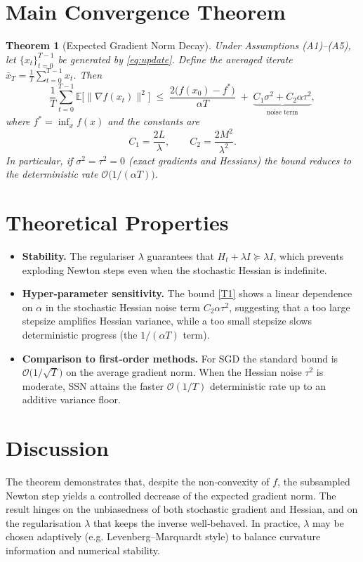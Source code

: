 \documentclass{article}
\newtheorem{theorem}{Theorem}
\newcommand{\EE}{\mathbb{E}}
\begin{document}
\section*{Main Convergence Theorem}
\begin{theorem}[Expected Gradient Norm Decay]
\label{thm:main}
Under Assumptions (A1)–(A5), let $\{x_t\}_{t=0}^{T-1}$ be generated by
\eqref{eq:update}.  Define the averaged iterate
$\bar x_T=\frac1T\sum_{t=0}^{T-1}x_t$.  Then
\[
\frac{1}{T}\sum_{t=0}^{T-1}\EE\bigl[\|\nabla f(x_t)\|^{2}\bigr]
\;\le\;
\frac{2\bigl(f(x_0)-f^{*}\bigr)}{\alpha T}
\;+\;
\underbrace{C_{1}\sigma^{2}+C_{2}\alpha\tau^{2}}_{\displaystyle\text{noise term}},
\tag{T1}
\]
where $f^{*}=\inf_{x}f(x)$ and the constants are
\[
C_{1}= \frac{2L}{\lambda},\qquad 
C_{2}= \frac{2M^{2}}{\lambda^{2}}.
\]
In particular, if $\sigma^{2}=\tau^{2}=0$ (exact gradients and
Hessians) the bound reduces to the deterministic rate
$\mathcal{O}\!\bigl(1/(\alpha T)\bigr)$.
\end{theorem}

\section*{Theoretical Properties}
\begin{itemize}
\item \textbf{Stability.}  The regulariser $\lambda$ guarantees that
  $H_t+\lambda I\succeq\lambda I$, which prevents exploding
  Newton steps even when the stochastic Hessian is indefinite.
\item \textbf{Hyper‑parameter sensitivity.}
  The bound \eqref{T1} shows a linear dependence on $\alpha$ in the
  stochastic Hessian noise term $C_{2}\alpha\tau^{2}$, suggesting that
  a too large stepsize amplifies Hessian variance, while a too small
  stepsize slows deterministic progress (the $1/(\alpha T)$ term).
\item \textbf{Comparison to first‑order methods.}
  For SGD the standard bound is $\mathcal{O}\bigl(1/\sqrt{T}\bigr)$ on the
  average gradient norm.  When the Hessian noise $\tau^{2}$ is moderate,
  SSN attains the faster $\mathcal{O}(1/T)$ deterministic rate up to an
  additive variance floor.
\end{itemize}

\section*{Discussion}
The theorem demonstrates that, despite the non‑convexity of $f$, the
subsampled Newton step yields a controlled decrease of the expected
gradient norm.  The result hinges on the unbiasedness of both stochastic
gradient and Hessian, and on the regularisation $\lambda$ that keeps the
inverse well‑behaved.  In practice, $\lambda$ may be chosen adaptively
(e.g. Levenberg–Marquardt style) to balance curvature information and
numerical stability.
\end{document}

